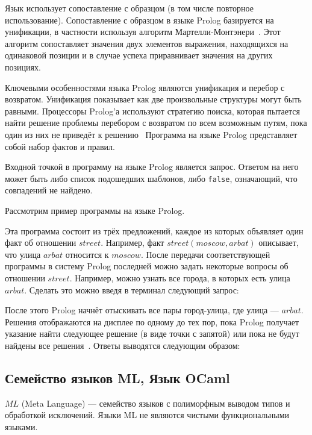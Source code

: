         Язык использует сопоставление с образцом (в том числе повторное использование).
        Сопоставление с образцом в языке Prolog базируется на унификации, в частности используя алгоритм Мартелли-Монтэнери~\cite{unify}.
        Этот алгоритм сопоставляет значения двух элементов выражения, находящихся на одинаковой позиции и в случае успеха приравнивает значения на других позициях.

        Ключевыми особенностями языка Prolog являются унификация и перебор с возвратом.
        Унификация показывает как две произвольные структуры могут быть равными.
        Процессоры Prolog'а используют стратегию поиска, которая пытается найти решение проблемы перебором с возвратом по всем возможным путям, пока один из них не приведёт к решению~\cite{prolog}
        Программа на языке Prolog представляет собой набор фактов и правил.

        Входной точкой в программу на языке Prolog является запрос.
        Ответом на него может быть либо список подошедших шаблонов, либо \verb!false!, означающий, что совпадений не найдено.

        Рассмотрим пример программы на языке Prolog.

        

        Эта программа состоит из трёх предложений, каждое из которых объявляет один факт об отношении $street$.
        Например, факт $street( moscow, arbat )$ описывает, что улица $arbat$ относится к $moscow$.
        После передачи соответствующей программы в систему Prolog последней можно задать некоторые вопросы об отношении $street$.
        Например, можно узнать все города, в которых есть улица $arbat$.
        Сделать это можно введя в терминал следующий запрос:

        

        После этого Prolog начнёт отыскивать все пары город-улица, где улица --- $arbat$.
        Решения отображаются на дисплее по одному до тех пор, пока Prolog получает указание найти следующее решение (в виде точки с запятой) или пока не будут найдены все решения~\cite{prolog_bratko}.
        Ответы выводятся следующим образом:

        

    \subsection{Семейство языков ML, Язык OCaml}
        $ML$ (Meta Language) --- семейство языков с полиморфным выводом типов и обработкой исключений.
        Языки ML не являются чистыми функциональными языками.
        
